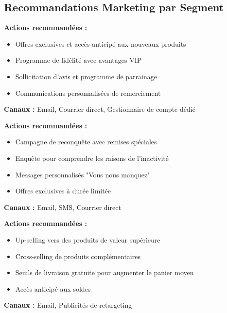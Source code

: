 \documentclass[11pt,a4paper]{article}
\begin{document}
\subsection{Recommandations Marketing par Segment}

\begin{tcolorbox}[title=Segment Champions (Priorité : HAUTE VALEUR), colback=white, colframe=black]
\textbf{Actions recommandées :}
\begin{itemize}
    \item Offres exclusives et accès anticipé aux nouveaux produits
    \item Programme de fidélité avec avantages VIP
    \item Sollicitation d'avis et programme de parrainage
    \item Communications personnalisées de remerciement
\end{itemize}
\textbf{Canaux :} Email, Courrier direct, Gestionnaire de compte dédié
\end{tcolorbox}

\begin{tcolorbox}[title=Segment À Risque (Priorité : URGENTE), colback=white, colframe=black]
\textbf{Actions recommandées :}
\begin{itemize}
    \item Campagne de reconquête avec remises spéciales
    \item Enquête pour comprendre les raisons de l'inactivité
    \item Messages personnalisés "Vous nous manquez"
    \item Offres exclusives à durée limitée
\end{itemize}
\textbf{Canaux :} Email, SMS, Courrier direct
\end{tcolorbox}

\begin{tcolorbox}[title=Segment Clients Actifs (Priorité : MOYENNE), colback=white, colframe=black]
\textbf{Actions recommandées :}
\begin{itemize}
    \item Up-selling vers des produits de valeur supérieure
    \item Cross-selling de produits complémentaires
    \item Seuils de livraison gratuite pour augmenter le panier moyen
    \item Accès anticipé aux soldes
\end{itemize}
\textbf{Canaux :} Email, Publicités de retargeting
\end{tcolorbox}
\end{document}
